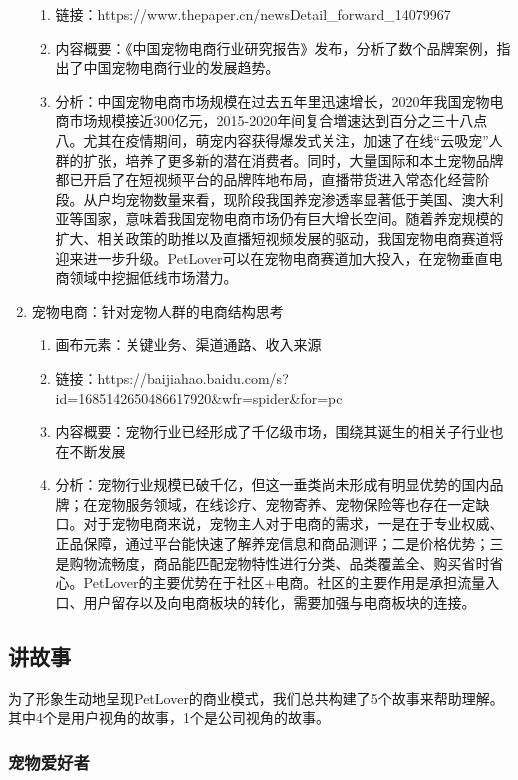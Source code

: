 \documentclass[a4paper]{ctexart}
\begin{document}
\begin{enumerate}[label=\alph*.]
\begin{enumerate}[label=\alph*.]
    \item 链接：https://www.thepaper.cn/newsDetail\_forward\_14079967
    \item 内容概要：《中国宠物电商行业研究报告》发布，分析了数个品牌案例，指出了中国宠物电商行业的发展趋势。
    \item 分析：中国宠物电商市场规模在过去五年里迅速增长，2020年我国宠物电商市场规模接近300亿元，2015-2020年间复合増速达到百分之三十八点八。尤其在疫情期间，萌宠内容获得爆发式关注，加速了在线“云吸宠”人群的扩张，培养了更多新的潜在消费者。同时，大量国际和本土宠物品牌都已开启了在短视频平台的品牌阵地布局，直播带货进入常态化经营阶段。从户均宠物数量来看，现阶段我国养宠渗透率显著低于美国、澳大利亚等国家，意味着我国宠物电商市场仍有巨大增长空间。随着养宠规模的扩大、相关政策的助推以及直播短视频发展的驱动，我国宠物电商赛道将迎来进一步升级。PetLover可以在宠物电商赛道加大投入，在宠物垂直电商领域中挖掘低线市场潜力。
  \end{enumerate}
  \item 宠物电商：针对宠物人群的电商结构思考
  \begin{enumerate}[label=\alph*.]
    \item 画布元素：关键业务、渠道通路、收入来源
    \item 链接：https://baijiahao.baidu.com/s?id=1685142650486617920\&wfr=spider\&for=pc
    \item 内容概要：宠物行业已经形成了千亿级市场，围绕其诞生的相关子行业也在不断发展
    \item 分析：宠物行业规模已破千亿，但这一垂类尚未形成有明显优势的国内品牌；在宠物服务领域，在线诊疗、宠物寄养、宠物保险等也存在一定缺口。对于宠物电商来说，宠物主人对于电商的需求，一是在于专业权威、正品保障，通过平台能快速了解养宠信息和商品测评；二是价格优势；三是购物流畅度，商品能匹配宠物特性进行分类、品类覆盖全、购买省时省心。PetLover的主要优势在于社区+电商。社区的主要作用是承担流量入口、用户留存以及向电商板块的转化，需要加强与电商板块的连接。
  \end{enumerate}
\end{enumerate}

\subsection{讲故事}

为了形象生动地呈现PetLover的商业模式，我们总共构建了5个故事来帮助理解。其中4个是用户视角的故事，1个是公司视角的故事。

\subsubsection{宠物爱好者}
\end{document}
